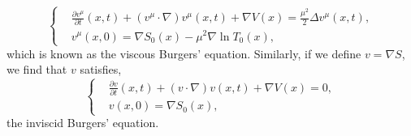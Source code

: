 \documentclass[a4paper,12pt,draft]{report}
\theoremstyle{remark}
\theoremstyle{definition}
\begin{document}
\begin{equation}
\left\{
\begin{aligned}
& \frac{\partial v^\mu}{\partial t}(x, t) + (v^\mu\cdot \nabla)v^\mu(x, t) + \nabla V(x) = \frac{\mu^2}{2}\Delta v^\mu(x, t),\\ \label{VBE}
& v^\mu(x, 0) = \nabla S_0(x) - \mu^2\nabla\ln T_0(x),
\end{aligned}
\right.
\end{equation}
which is known as the viscous Burgers' equation.  Similarly, if we define $v = \nabla S$, we find that $v$ satisfies,
\begin{equation}
\left\{
\begin{aligned}
& \frac{\partial v}{\partial t}(x, t) + (v\cdot \nabla)v(x, t) + \nabla V(x) = 0,\\ \label{IBE}
& v(x, 0) = \nabla S_0(x),
\end{aligned}
\right.
\end{equation}
the inviscid Burgers' equation.
\end{document}

